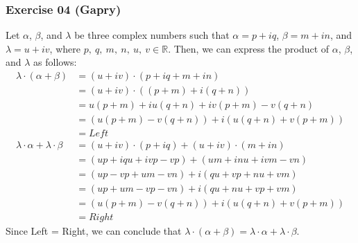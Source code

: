 \subsubsection*{Exercise 04 (Gapry)}

\begin{flushleft}
Let $\alpha$, $\beta$, and $\lambda$ be three complex numbers such that $\alpha = p + iq$, $\beta  = m + in$, and $\lambda = u + iv$, where $p,\ q,\ m,\ n,\ u,\ v \in \mathbb{R}$. Then, we can express the product of $\alpha$, $\beta$, and $\lambda$ as follows:
\begin{align*}
\lambda \cdot (\alpha + \beta) &= (u + iv) \cdot (p + iq + m + in) \\
                               &= (u + iv) \cdot ((p + m) + i(q + n)) \\
                               &= u(p + m) + iu(q + n) + iv(p + m) - v(q + n) \\
                               &= (u(p + m) - v(q + n)) + i(u(q + n) + v(p + m)) \\
                               &= Left \\ 
\lambda \cdot \alpha + \lambda  \cdot \beta &= (u + iv) \cdot (p + iq) + (u + iv) \cdot (m + in) \\
                                            &= (up + iqu + ivp - vp) + (um + inu + ivm - vn) \\
                                            &= (up - vp + um - vn) + i(qu + vp + nu + vm) \\
                                            &= (up + um - vp - vn) + i(qu + nu + vp + vm) \\
                                            &= (u(p + m) - v(q + n)) + i(u(q + n) + v(p + m)) \\
                                            &= Right
\end{align*}
Since Left = Right, we can conclude that $\lambda \cdot (\alpha + \beta) = \lambda \cdot \alpha + \lambda  \cdot \beta$.
\end{flushleft}

